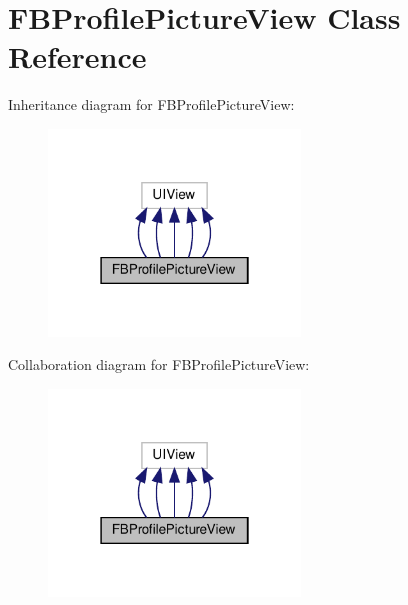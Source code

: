 \hypertarget{interfaceFBProfilePictureView}{}\section{F\+B\+Profile\+Picture\+View Class Reference}
\label{interfaceFBProfilePictureView}


Inheritance diagram for F\+B\+Profile\+Picture\+View\+:
\nopagebreak
\begin{figure}[H]
\begin{center}
\leavevmode
\includegraphics[width=190pt]{interfaceFBProfilePictureView__inherit__graph}
\end{center}
\end{figure}


Collaboration diagram for F\+B\+Profile\+Picture\+View\+:
\nopagebreak
\begin{figure}[H]
\begin{center}
\leavevmode
\includegraphics[width=190pt]{interfaceFBProfilePictureView__coll__graph}
\end{center}
\end{figure}
